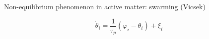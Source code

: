 \documentclass{beamer}
\begin{document}
\begin{frame}{Non-equilibrium phenomenon in active matter: swarming (Vicsek)}

%

\begin{minipage}{0.35\linewidth}
\begin{figure}
\centering

\end{figure}
\begin{equation}
\dot{\theta}_i = \frac{1}{\tau_p}(\varphi_i - \theta_i) + \xi_i
\end{equation}
\end{minipage}
\hfill
\begin{minipage}{0.6\linewidth}
\end{minipage}


\end{frame}
\end{document}

